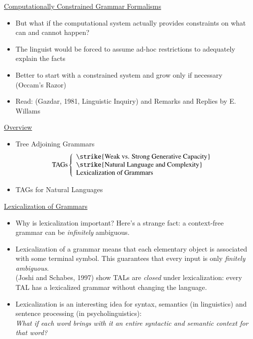 \documentclass[landscape]{slides}
\begin{document}
\begin{slide}{\underline{Computationally Constrained Grammar Formalisms}}
\begin{itemize}
\item But what if the computational system actually provides constraints on what can and cannot happen?
\item The linguist would be forced to assume ad-hoc restrictions to adequately explain the facts
\item Better to start with a constrained system and grow only if necessary (Occam's Razor)
\item Read: (Gazdar, 1981, Linguistic Inquiry) and Remarks and Replies by E. Willams
\end{itemize}
\end{slide}

\begin{slide}{\underline{Overview}}
\begin{itemize}
\item Tree Adjoining Grammars \[ \textrm{TAGs} \left\{ 
\begin{array}{l}
\textrm{\strike{Weak vs. Strong Generative Capacity}}\\
\textrm{\strike{Natural Language and Complexity}}\\
\textrm{Lexicalization of Grammars}
\end{array}
\right. \]
\item TAGs for Natural Languages
\end{itemize}
\end{slide}

\begin{slide}{\underline{Lexicalization of Grammars}}
\begin{itemize}
\item Why is lexicalization important? Here's a strange fact: a context-free grammar can be {\em infinitely} ambiguous.
\item Lexicalization of a grammar means that each elementary object is associated with some terminal symbol. This guarantees that every input is only {\em finitely ambiguous}.\\
(Joshi and Schabes, 1997) show TALs are {\em closed} under lexicalization: every TAL has a lexicalized grammar without changing the language.
\item Lexicalization is an interesting idea for syntax, semantics (in linguistics) and sentence processing (in psycholinguistics):\\
{\em What if each word brings with it an entire syntactic and semantic context for that word?}
\end{itemize}
\end{slide}
\end{document}
